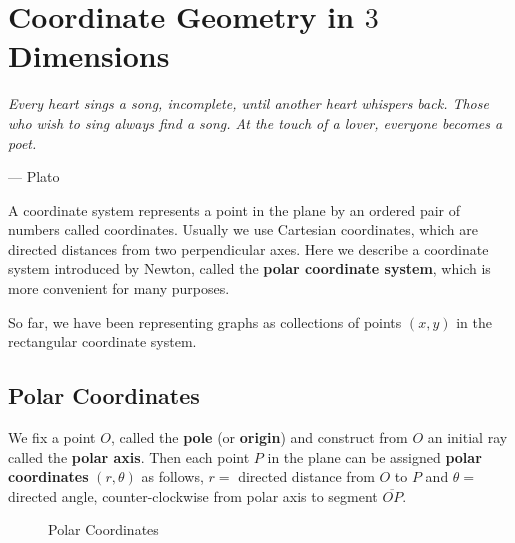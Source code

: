 \documentclass[titlepage,a4paper,12pt]{report}
\begin{document}
\chapter{Coordinate Geometry in $3$ Dimensions}\begin{center}
\small{\parbox{18cm}{
		\begin{raggedright}
		{\small
		\textit{Every heart sings a song, incomplete, until another heart whispers back. Those who wish to sing always find a song. At the touch of a lover, everyone becomes a poet.}
 }
 
				\vspace{.5cm}\hfill{--- Plato}
		\end{raggedright}
	}
} 
\end{center}
A coordinate system represents a point in the plane by an ordered pair of numbers called
coordinates. Usually we use Cartesian coordinates, which are directed distances from two
perpendicular axes. Here we describe a coordinate system introduced by Newton, called
the \textbf{polar coordinate system}, which is more convenient for many purposes.

\noindent So far, we have been representing graphs as collections of points $(x,y)$ in the rectangular coordinate system. 
\section{Polar Coordinates}
We fix a point $O$, called the \textbf{pole} (or \textbf{origin}) and construct from $O$ an initial ray called the \textbf{polar axis}. Then each point $P$ in the plane can be assigned \textbf{polar coordinates} $(r, \theta)$ as follows, $r=$ directed distance from $O$ to $P$ and $\theta =$ directed angle, counter-clockwise from polar axis to segment $\overline{OP}$.
\begin{figure}[h!]

\caption{Polar Coordinates}
\end{figure}
\end{document}
